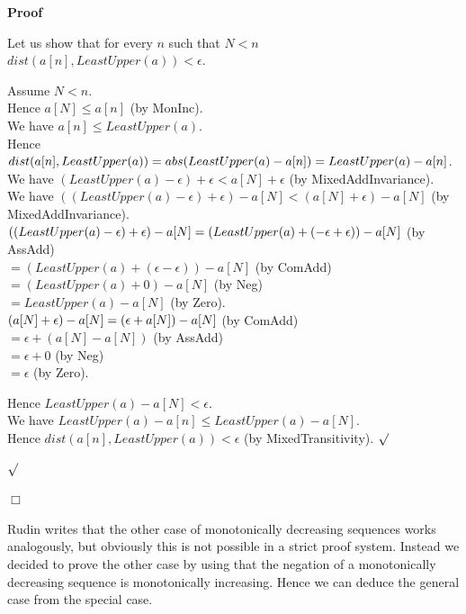 \documentclass{article}
\newenvironment{forthel}{\begin{leftbar}}{\end{leftbar}}
\newenvironment{proof}{\noindent\textbf{Proof\ }}{\hspace*{\fill}$\Box$\medskip}
\newenvironment{subproof}{\begin{list}{}{}
		\item[\text{Proof}]}{\hfill $\surd$ \end{list}}
\newcommand{\dotequal}{=}
\begin{document}
\begin{forthel}
\begin{proof}
\begin{subproof}
			Let us show that for every $n$ such that $N < n$\\ $dist(a[n],LeastUpper(a)) < \epsilon$.
			\begin{subproof}
				Assume $N < n$.\\
				Hence $a[N] \leq a[n]$ (by MonInc).\\
				We have $a[n] \leq LeastUpper(a)$.\\
				Hence $dist(a[n],LeastUpper(a)) = abs(LeastUpper(a) - a[n])\\ = LeastUpper(a) - a[n]$.\\
				We have $(LeastUpper(a) - \epsilon) + \epsilon < a[N] + \epsilon$ (by MixedAddInvariance).\\
				We have $((LeastUpper(a) - \epsilon) + \epsilon) - a[N] < (a[N] + \epsilon) - a[N]$ (by MixedAddInvariance).\\
				
				$((LeastUpper(a) - \epsilon) + \epsilon) - a[N]\\
				\dotequal (LeastUpper(a) + (-\epsilon + \epsilon)) - a[N]$ (by AssAdd)\\
				$\dotequal (LeastUpper(a) + (\epsilon - \epsilon)) - a[N]$ (by ComAdd)\\
				$\dotequal (LeastUpper(a) + 0) - a[N]$ (by Neg)\\
				$\dotequal LeastUpper(a) - a[N]$ (by Zero).\\
				
				$(a[N] + \epsilon) - a[N]\\ \dotequal (\epsilon + a[N]) - a[N]$ (by ComAdd)\\
				$\dotequal \epsilon + (a[N] - a[N])$ (by AssAdd)\\
				$\dotequal \epsilon + 0$ (by Neg)\\
				$\dotequal \epsilon$ (by Zero).
				
				Hence $LeastUpper(a) - a[N] < \epsilon$.\\
				We have $LeastUpper(a) - a[n] \leq LeastUpper(a) - a[N]$.\\
				Hence $dist(a[n],LeastUpper(a)) < \epsilon$ (by MixedTransitivity).
			\end{subproof}
		\end{subproof}
	\end{proof}
\end{forthel}
	
\noindent Rudin writes that the other case of monotonically decreasing sequences works analogously, but obviously this is not possible in a strict proof system. Instead we decided to prove the other case by using that the negation of a monotonically decreasing sequence is monotonically increasing. Hence we can deduce the general case from the special case.
	
\end{document}
